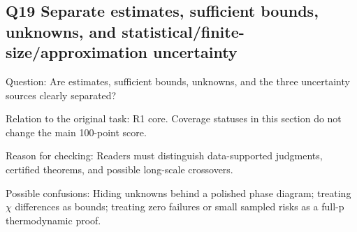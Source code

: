 \documentclass[11pt,a4paper]{article}
\begin{document}
\clearpage
\subsection{Q19 Separate estimates,\allowbreak{} sufficient bounds,\allowbreak{} unknowns,\allowbreak{} and statistical/\allowbreak{}finite-size/\allowbreak{}approximation uncertainty}
\label{aspect:Q19}
Question: Are estimates,\allowbreak{} sufficient bounds,\allowbreak{} unknowns,\allowbreak{} and the three uncertainty sources clearly separated?

Relation to the original task: R1 core. Coverage statuses in this section do not change the main 100-point score.

Reason for checking: Readers must distinguish data-supported judgments,\allowbreak{} certified theorems,\allowbreak{} and possible long-scale crossovers.

Possible confusions: Hiding unknowns behind a polished phase diagram; treating \ensuremath{\chi} differences as bounds; treating zero failures or small sampled risks as a full-p thermodynamic proof.
\end{document}
